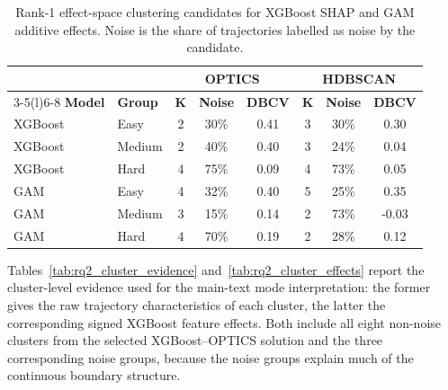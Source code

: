 \documentclass[12pt]{article}
\begin{document}
\begin{table}[H]
  \centering
  
  \caption[Rank-1 clustering candidates for both meta-models]{Rank-1 effect-space clustering candidates for XGBoost SHAP and GAM additive effects. Noise is the share of trajectories labelled as noise by the candidate.}
  \label{tab:appendix_cluster_candidates}
  \footnotesize
  \renewcommand{\arraystretch}{1.12}
  \begin{tabular}{llcccccc}
    \toprule
    & & \multicolumn{3}{c}{\textbf{OPTICS}} & \multicolumn{3}{c}{\textbf{HDBSCAN}} \\
    \cmidrule(lr){3-5}\cmidrule(l){6-8}
    \textbf{Model} & \textbf{Group} & \textbf{K} & \textbf{Noise} & \textbf{DBCV} & \textbf{K} & \textbf{Noise} & \textbf{DBCV} \\
    \midrule
    XGBoost & Easy   & 2 & 30\% & 0.41 & 3 & 30\% & 0.30 \\
    XGBoost & Medium & 2 & 40\% & 0.40 & 3 & 24\% & 0.04 \\
    XGBoost & Hard   & 4 & 75\% & 0.09 & 4 & 73\% & 0.05 \\
    GAM     & Easy   & 4 & 32\% & 0.40 & 5 & 25\% & 0.35 \\
    GAM     & Medium & 3 & 15\% & 0.14 & 2 & 73\% & -0.03 \\
    GAM     & Hard   & 4 & 70\% & 0.19 & 2 & 28\% & 0.12 \\
    \bottomrule
  \end{tabular}
\end{table}

Tables~\ref{tab:rq2_cluster_evidence} and~\ref{tab:rq2_cluster_effects} report the cluster-level evidence used for the main-text mode interpretation: the former gives the raw trajectory characteristics of each cluster, the latter the corresponding signed XGBoost feature effects. Both include all eight non-noise clusters from the selected XGBoost--OPTICS solution and the three corresponding noise groups, because the noise groups explain much of the continuous boundary structure.
\end{document}
